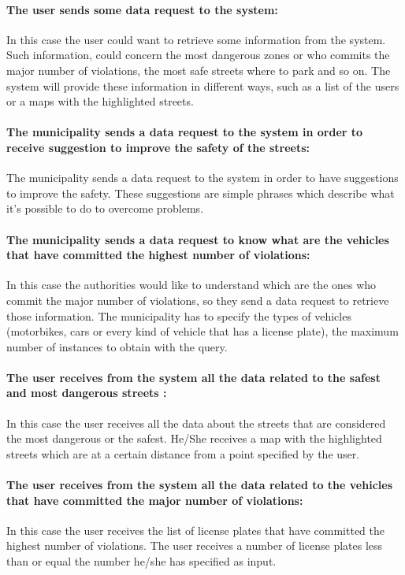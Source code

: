 \documentclass[titlepage]{article}
\begin{document}
\paragraph{The user sends some data request to the system: }
In this case the user could want to retrieve some information from the system. Such information, could concern the most dangerous zones or who commits the major number of violations, the most safe streets where to park and so on. The system will provide these information in different ways, such as a list of the users or a maps with the highlighted streets.
\paragraph{The municipality sends a data request to the 				   system  in order to receive suggestion to improve 			   the 	safety 	of the streets: }
The municipality sends a data request to the system in order to have suggestions to improve the safety. These suggestions are simple phrases which describe what it's possible to do to overcome problems.
\paragraph{The municipality sends a data request to know what 		   are the vehicles that have committed the highest 	         		  number of violations: }
In this case the authorities would like to understand which are the ones who commit the major number of violations, so they send a data request to retrieve those information. The municipality has to specify the types of vehicles (motorbikes, cars or every kind of vehicle that has a license plate), the maximum number of instances to obtain with the query.
\paragraph{The user receives from the system all the data 			related to the safest and most dangerous streets : }
In this case the user receives all the data about the streets that are considered the most dangerous or the safest. He/She receives a map with the highlighted streets which are at a certain distance from a point specified by the user.
\paragraph{The user receives from the system all the data related to the vehicles that have committed the major number of violations:}
In this case the user receives the list of license plates that have committed the highest number of violations. The user receives a number of license plates less than or equal the number he/she has specified as input.
\end{document}
